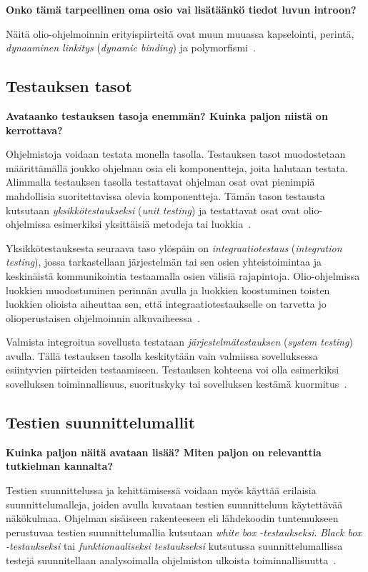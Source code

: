 \documentclass[finnish, grading]{tktltiki2}
\theoremstyle{definition}
\theoremstyle{remark}
\begin{document}
\textbf{Onko tämä tarpeellinen oma osio vai lisätäänkö tiedot luvun introon?} 

 Näitä olio-ohjelmoinnin erityispiirteitä ovat muun muuassa kapselointi, perintä, \textit{dynaaminen linkitys} (\textit{dynamic binding}) ja polymorfismi~\cite[s. 86]{Mariani:Pezze:2008}.


\subsection{Testauksen tasot}

\textbf{Avataanko testauksen tasoja enemmän? Kuinka paljon niistä on kerrottava?}

Ohjelmistoja voidaan testata monella tasolla. Testauksen tasot muodostetaan määrittämällä joukko ohjelman osia eli komponentteja, joita halutaan testata. Alimmalla testauksen tasolla testattavat ohjelman osat ovat pienimpiä mahdollisia suoritettavissa olevia komponentteja. Tämän tason testausta kutsutaan \textit{yksikkötestaukseksi} (\textit{unit testing}) ja testattavat osat ovat olio-ohjelmissa esimerkiksi yksittäisiä metodeja tai luokkia~\cite[s. 45]{Binder:1999}.

Yksikkötestauksesta seuraava taso ylöspäin on \textit{integraatiotestaus} (\textit{integration testing}), jossa tarkastellaan järjestelmän tai sen osien yhteistoimintaa ja keskinäistä kommunikointia testaamalla osien välisiä rajapintoja. Olio-ohjelmissa luokkien muodostuminen perinnän avulla ja luokkien koostuminen toisten luokkien olioista aiheuttaa sen, että integraatiotestaukselle on tarvetta jo olioperustaisen ohjelmoinnin alkuvaiheessa~\cite[s. 45]{Binder:1999}.

Valmista integroitua sovellusta testataan \textit{järjestelmätestauksen} (\textit{system testing}) avulla. Tällä testauksen tasolla keskitytään vain valmiissa sovelluksessa esiintyvien piirteiden testaamiseen. Testauksen kohteena voi olla esimerkiksi sovelluksen toiminnallisuus, suorituskyky tai sovelluksen kestämä kuormitus~\cite[s. 45]{Binder:1999}.


\subsection{Testien suunnittelumallit}

\textbf{Kuinka paljon näitä avataan lisää? Miten paljon on relevanttia tutkielman kannalta?}

Testien suunnittelussa ja kehittämisessä voidaan myös käyttää erilaisia suunnittelumalleja, joiden avulla kuvataan testien suunnitteluun käytettävää näkökulmaa. Ohjelman sisäiseen rakenteeseen eli lähdekoodin tuntemukseen perustuvaa testien suunnittelumallia kutsutaan \textit{white box -testaukseksi}. \textit{Black box -testaukseksi} tai \textit{funktionaaliseksi testaukseksi} kutsutussa suunnittelumallissa testejä suunnitellaan analysoimalla ohjelmiston ulkoista toiminnallisuutta~\cite[s. 52]{Binder:1999}.
\end{document}

